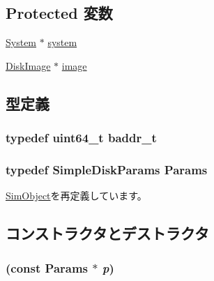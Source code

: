 \subsection*{Protected 変数}
\begin{DoxyCompactItemize}
\item 
\hyperlink{classSystem}{System} $\ast$ \hyperlink{classSimpleDisk_af27ccd765f13a4b7bd119dc7579e2746}{system}
\item 
\hyperlink{classDiskImage}{DiskImage} $\ast$ \hyperlink{classSimpleDisk_a86d47120637a95e3a6876c774d768030}{image}
\end{DoxyCompactItemize}


\subsection{型定義}
\hypertarget{classSimpleDisk_afee2ead885909c1108a7523ee536d096}{
\subsubsection[{baddr\_\-t}]{\setlength{\rightskip}{0pt plus 5cm}typedef uint64\_\-t {\bf baddr\_\-t}}}
\label{classSimpleDisk_afee2ead885909c1108a7523ee536d096}
\hypertarget{classSimpleDisk_a65e935e8cfb2d781b38481c79c2ece76}{
\subsubsection[{Params}]{\setlength{\rightskip}{0pt plus 5cm}typedef SimpleDiskParams {\bf Params}}}
\label{classSimpleDisk_a65e935e8cfb2d781b38481c79c2ece76}


\hyperlink{classSimObject_a0f0761d2db586a23bb2a2880b8f387bb}{SimObject}を再定義しています。

\subsection{コンストラクタとデストラクタ}
\hypertarget{classSimpleDisk_afa3d068c2a6e40b01c7ea1c4cf0034b9}{
\subsubsection[{SimpleDisk}]{ (const {\bf Params} $\ast$ {\em p})}}
\label{classSimpleDisk_afa3d068c2a6e40b01c7ea1c4cf0034b9}



